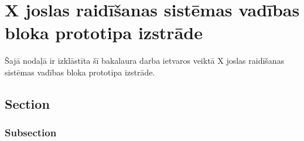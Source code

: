 \chapter{X joslas raidīšanas sistēmas vadības bloka prototipa izstrāde}

Šajā nodaļā ir izklāstīta šī bakalaura darba ietvaros veiktā X joslas raidīšanas sistēmas vadības bloka prototipa izstrāde. 

\section{Section}

\subsection{Subsection}

